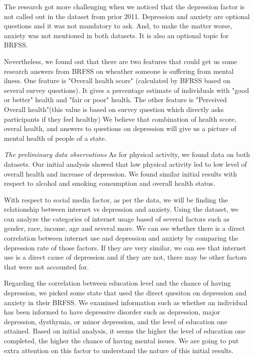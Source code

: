 \documentclass[letterpaper, 10 pt, conference]{ieeeconf}  %
\begin{document}
The research got more challenging when we noticed that 
the depression factor is not called out in the dataset from prior 2011. 
Depression and anxiety are optional questions and it was not mandatory to ask.
And, to make the matter worse, anxiety 
was not mentioned in both datasets. It is also an optional topic for BRFSS. 

Nevertheless, we found out that there are two features that could get us
some research answers from BRFSS on wheather someone is suffering from mental ilness. 
One feature is "Overall health score" (calculated by BFRSS based on several survey questions). 
It gives a percentage estimate of individuals with "good or better" health and "fair or poor" health.
The other feature is "Perceived Overall health"(this value is based on survey question which directly 
asks participants if they feel healthy)
We believe that combination of health score, overal health, and answers to questions on depression will 
give us a picture of mental health of people of a state. 

\par\noindent\textit{The preliminary data observations}\newline\newline
As for physical activity, we found data on both datasets. Our initial analysis 
showed that low physical activity led to low level of overall health and increase of depression. We found similar 
initial results with respect to alcohol and smoking consumption and overall health status.  

With respect to social media factor, as per the data, we will be finding the relationship between internet vs 
depression and anxiety. Using the dataset, we can analyze the categories of internet usage based of several 
factors such as gender, race, income, age and several more. We can see whether there is a direct correlation 
between internet use and depression and anxiety by comparing the depression rate of those factors. If they are 
very similar, we can see that internet use is a direct cause of depression and if they are not, there may be 
other factors that were not accounted for.

Regarding the correlation between education level and the chance of having depression, we picked some state 
that used the direct quesiton on depression and anxiety in their BRFSS.  
We examined information such as whether an individual has been informed to have 
depressive disorder such as depression, major depression, dysthymia, or minor depression, and the level of 
education one attained. Based on initial analysis, it seems the higher the level of education one completed, 
the higher the chance of having mental issues. We are going to put extra attention on this factor to understand 
the nature of this initial results.
\end{document}
